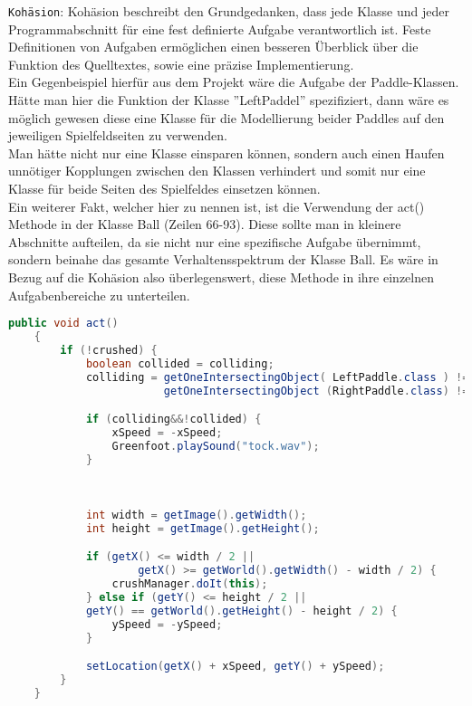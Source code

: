 \documentclass{pi1}
\begin{document}
\texttt{Kohäsion}:
Kohäsion beschreibt  den Grundgedanken, dass jede Klasse und jeder Programmabschnitt für eine fest definierte Aufgabe verantwortlich ist. Feste Definitionen von Aufgaben ermöglichen einen besseren Überblick über die Funktion des Quelltextes, sowie eine präzise Implementierung.\\
Ein Gegenbeispiel hierfür aus dem Projekt wäre die Aufgabe der Paddle-Klassen.
Hätte man hier die Funktion der Klasse ''LeftPaddel'' spezifiziert, dann wäre es möglich gewesen diese eine Klasse für die Modellierung beider Paddles auf den jeweiligen Spielfeldseiten zu verwenden.\\
Man hätte nicht nur eine Klasse einsparen können, sondern auch einen Haufen unnötiger Kopplungen zwischen den Klassen verhindert und somit nur eine Klasse für beide Seiten des Spielfeldes einsetzen können.\\
Ein weiterer Fakt, welcher hier zu nennen ist, ist die Verwendung der act() Methode in der Klasse Ball (Zeilen 66-93). Diese sollte man in kleinere Abschnitte aufteilen, da sie nicht nur eine spezifische Aufgabe übernimmt, sondern beinahe das gesamte Verhaltensspektrum der Klasse Ball. Es wäre in Bezug auf die Kohäsion also überlegenswert, diese Methode in ihre einzelnen Aufgabenbereiche zu unterteilen.

\begin{lstlisting}[caption={act() Methode der Klasse Ball}, firstnumber=66, language=Java]
public void act() 
    {
        if (!crushed) {
            boolean collided = colliding;
            colliding = getOneIntersectingObject( LeftPaddle.class ) != null || 
                        getOneIntersectingObject (RightPaddle.class) != null;

            if (colliding&&!collided) {
                xSpeed = -xSpeed;
                Greenfoot.playSound("tock.wav");
            }

            
            
            int width = getImage().getWidth();
            int height = getImage().getHeight();

            if (getX() <= width / 2 ||
                    getX() >= getWorld().getWidth() - width / 2) {
                crushManager.doIt(this);
            } else if (getY() <= height / 2 ||
            getY() == getWorld().getHeight() - height / 2) {
                ySpeed = -ySpeed;
            }

            setLocation(getX() + xSpeed, getY() + ySpeed);
        }
    }
\end{lstlisting}
\end{document}

